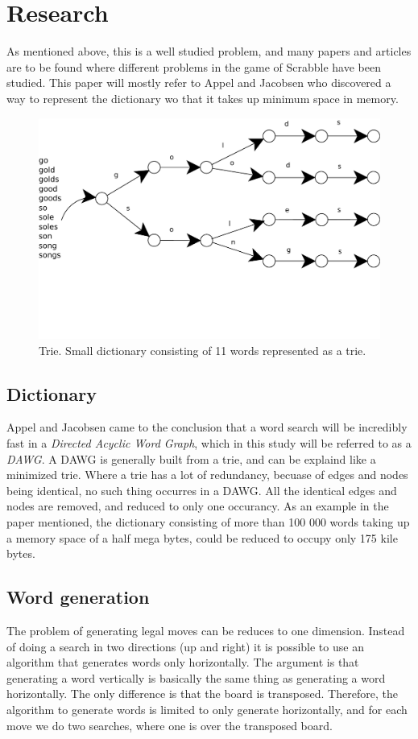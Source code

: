 \documentclass[a4paper, 12pt]{report}
\begin{document}
\section{Research}
As mentioned above, this is a well studied problem, and many papers and articles are to be found where different problems in the game of Scrabble have been studied. This paper will mostly refer to Appel and Jacobsen \cite{fastest} who discovered a way to represent the dictionary wo that it takes up minimum space in memory.
\begin{figure}
\centering
\includegraphics[scale=0.5]{trie}
\caption{Trie. Small dictionary consisting of 11 words represented as a trie.}
\end{figure}
\subsection{Dictionary}
Appel and Jacobsen \cite{fastest} came to the conclusion that a word search will be incredibly fast in a \emph{Directed Acyclic Word Graph}, which in this study will be referred to as a \emph{DAWG}. A DAWG is generally built from a trie, and can be explaind like a minimized trie. Where a trie has a lot of redundancy, becuase of edges and nodes being identical, no such thing occurres in a DAWG. All the identical edges and nodes are removed, and reduced to only one occurancy. As an example in the paper mentioned, the dictionary consisting of more than 100 000 words taking up a memory space of a half mega bytes, could be reduced to occupy only 175 kile bytes.


\subsection{Word generation}
The problem of generating legal moves can be reduces to one dimension. Instead of doing a search in two directions (up and right) it is possible to use an algorithm that generates words only horizontally. The argument is that generating a word vertically is basically the same thing as generating a word horizontally. The only difference is that the board is transposed. Therefore, the algorithm to generate words is limited to only generate horizontally, and for each move we do two searches, where one is over the transposed board.
\end{document}
